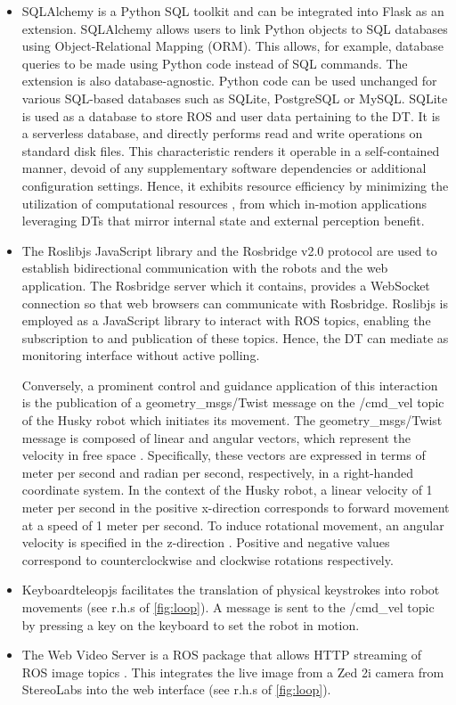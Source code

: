 \documentclass[conference]{IEEEtran}
\begin{document}
\begin{itemize}
\item SQLAlchemy is a Python SQL toolkit and can be integrated into Flask as an extension. SQLAlchemy allows users to link Python objects to SQL databases using Object-Relational Mapping (ORM). This allows, for example, database queries to be made using Python code instead of SQL commands. The extension is also database-agnostic. 
Python code can be used unchanged for various SQL-based databases such as SQLite, PostgreSQL or MySQL. \cite{sqlalchemy} 
SQLite is used as a database to store ROS and user data pertaining to the DT. It is a serverless database, and directly performs read and write operations on standard disk files. This characteristic renders it operable in a self-contained manner, devoid of any supplementary software dependencies or additional configuration settings. Hence, it exhibits resource efficiency by minimizing the utilization of computational resources \cite{sqlite}, from which in-motion applications leveraging DTs that mirror internal state and external perception  benefit. 
\item The Roslibjs JavaScript library and the Rosbridge v2.0 protocol are used to establish bidirectional communication with the robots and the web application. The Rosbridge server which it contains, provides a WebSocket connection so that web browsers can communicate with Rosbridge.
Roslibjs is employed as a JavaScript library to interact with ROS topics, enabling the subscription to and publication of these topics. \cite{rosbridgeOkState, rosbridgeSuite} Hence,  the DT can mediate as monitoring interface without active polling.

Conversely, a prominent control and guidance application of this interaction is the publication of a geometry\_msgs/Twist message on the /cmd\_vel topic of the Husky robot which initiates its movement.
The geometry\_msgs/Twist message is composed of linear and angular vectors, which represent the velocity in free space \cite{twistmsg}. Specifically, these vectors are expressed in terms of meter per second and radian per second, respectively, in a right-handed coordinate system.
In the context of the Husky robot, a linear velocity of 1 meter per second in the positive x-direction corresponds to forward movement at a speed of 1 meter per second. To induce rotational movement, an angular velocity is specified in the z-direction \cite{huskydriving}. Positive and negative values correspond to counterclockwise and clockwise rotations respectively.
\item Keyboardteleopjs facilitates the translation of physical keystrokes into robot movements (see r.h.s of \cref{fig:loop}). A message is sent to the /cmd\_vel topic by pressing a key on the keyboard to set the robot in motion. \cite{keyboardteleopjs}
\item The Web Video Server is a ROS package that allows HTTP streaming of ROS image topics \cite{webvideoserver}. This integrates the live image from a Zed 2i camera from StereoLabs \cite{zed} into the web interface (see r.h.s of \cref{fig:loop}).


\end{itemize}
\end{document}
